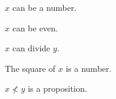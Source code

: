 \begin{signature}\label{triangle}
    $x$ can be a number.
\end{signature}

\begin{signature}\label{even}
    $x$ can be even.
\end{signature}

\begin{signature}\label{div}
    $x$ can divide $y$.
\end{signature}

\begin{signature}\label{square}
    The square of $x$ is a number.
\end{signature}

\begin{signature}\label{nless}
    $x \nless y$ is a proposition.
\end{signature}
